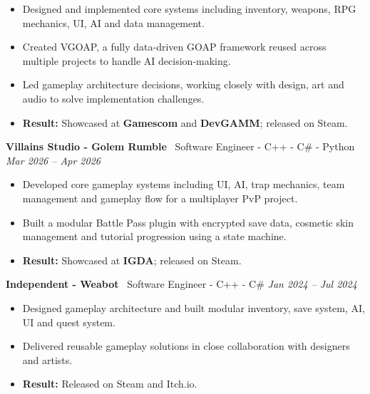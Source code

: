 \documentclass[8.5pt]{article}
\begin{document}
    \begin{itemize}
        \item Designed and implemented core systems including inventory, weapons, RPG mechanics, UI, AI and data management.
        \item Created VGOAP, a fully data-driven GOAP framework reused across multiple projects to handle AI decision-making.
        \item Led gameplay architecture decisions, working closely with design, art and audio to solve
        implementation challenges.
        \item \textbf{Result:} Showcased at \textbf{Gamescom} and \textbf{DevGAMM}; released on Steam.
    \end{itemize}

    \vspace{2pt}

    \textbf{Villains Studio - Golem Rumble} \textemdash\ Software Engineer - C++ - C\# - Python
    \hfill
    \textit{Mar 2026 -- Apr 2026}

    \begin{itemize}
        \item Developed core gameplay systems including UI, AI, trap mechanics, team management and gameplay flow for a multiplayer PvP project.
        \item Built a modular Battle Pass plugin with encrypted save data, cosmetic skin management and tutorial progression using a state machine.
        \item \textbf{Result:} Showcased at \textbf{IGDA}; released on Steam.
    \end{itemize}

    \vspace{2pt}

    \textbf{Independent - Weabot} \textemdash\ Software Engineer - C++ - C\#
    \hfill
    \textit{Jan 2024 -- Jul 2024}

    \begin{itemize}
        \item Designed gameplay architecture and built modular inventory, save system, AI, UI and quest system.
        \item Delivered reusable gameplay solutions in close collaboration with designers and artists.
        \item \textbf{Result:} Released on Steam and Itch.io.
    \end{itemize}

    \vspace{2pt}
\end{document}
